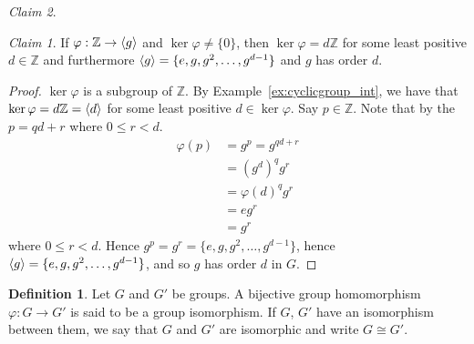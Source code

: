 \documentclass[12pt,letterpaper,DIV=11,final]{scrartcl}
\theoremstyle{plain}
\theoremstyle{definition}
\newtheorem{definition}{Definition}[section]
\theoremstyle{remark}
\newtheorem{claim}{Claim}
\begin{document}
\begin{claim}
  \begin{claim}
    If $\varphi : \mathbb{Z} \to \braket{g}$ and $\ker \varphi \neq \{ 0 \}$,
    then $\ker \varphi = d \mathbb{Z}$ for some least positive $d \in \mathbb{Z}$ and furthermore $\braket{g} = \{ e, g, g^2, \dots, g^{d - 1} \}$ and $g$ has order $d$.

    \begin{proof}
      $\ker \varphi$ is a subgroup of $\mathbb{Z}$. By Example~\ref{ex:cyclicgroup_int},
      we have that $\ker \varphi = d \mathbb{Z} = \braket{d}$ for some least positive $d \in \ker \varphi$.
      Say $p \in \mathbb{Z}$.
      Note that by the  $p = qd + r$ where $0 \leq r < d$.
      \begin{align*}
        \varphi(p) &= g^p = g^{qd + r} \\
                   &= {(g^d)}^q g^r \\
                   &= {\varphi(d)}^q g^r \\
                   &= e g^r \\
                   &= g^r
      \end{align*}
      where $0 \leq r < d$.
      Hence $g^p = g^r = \{ e, g, g^2, \dots, g^{d - 1} \}$, hence $\braket{g} = \{ e, g, g^2, \dots, g^{d - 1} \}$, and so $g$ has order $d$ in $G$.
    \end{proof}
  \end{claim}
\end{claim}

\begin{definition}
  Let $G$ and $G'$ be groups.
  A bijective group homomorphism $\varphi : G \to G'$ is said to be a group isomorphism.
  If $G$, $G'$ have an isomorphism between them, we say that $G$ and $G'$ are isomorphic and write $G \cong G'$.
\end{definition}
\end{document}
